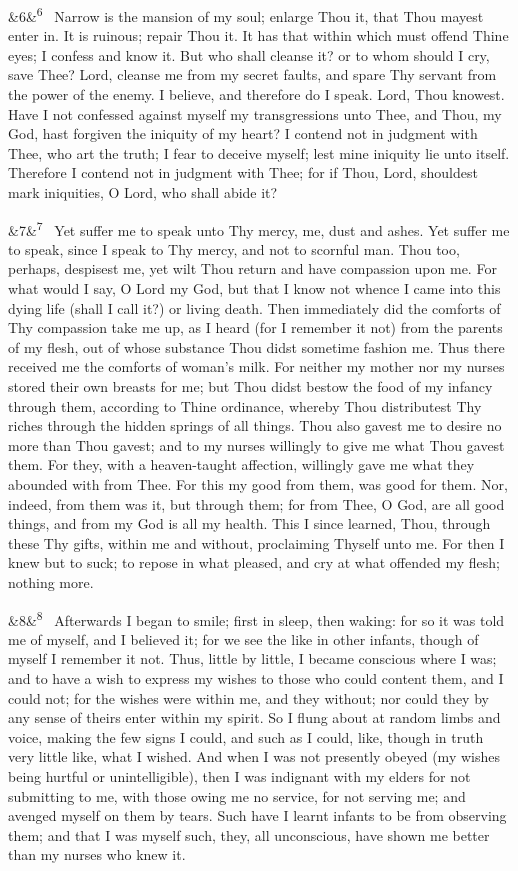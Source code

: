 \documentclass[12pt]{article}
\newcommand{\para}[1][]{\par\noindent\ifx&#1&\else\textsuperscript{\footnotesize #1}~\fi}
\begin{document}
\para[6] Narrow is the mansion of my soul; enlarge Thou it, that Thou mayest enter in. It is ruinous; repair Thou it. It has that within which must offend Thine eyes; I confess and know it. But who shall cleanse it? or to whom should I cry, save Thee? Lord, cleanse me from my secret faults, and spare Thy servant from the power of the enemy. I believe, and therefore do I speak. Lord, Thou knowest. Have I not confessed against myself my transgressions unto Thee, and Thou, my God, hast forgiven the iniquity of my heart? I contend not in judgment with Thee, who art the truth; I fear to deceive myself; lest mine iniquity lie unto itself. Therefore I contend not in judgment with Thee; for if Thou, Lord, shouldest mark iniquities, O Lord, who shall abide it?

\para[7] Yet suffer me to speak unto Thy mercy, me, dust and ashes. Yet suffer me to speak, since I speak to Thy mercy, and not to scornful man. Thou too, perhaps, despisest me, yet wilt Thou return and have compassion upon me. For what would I say, O Lord my God, but that I know not whence I came into this dying life (shall I call it?) or living death. Then immediately did the comforts of Thy compassion take me up, as I heard (for I remember it not) from the parents of my flesh, out of whose substance Thou didst sometime fashion me. Thus there received me the comforts of woman's milk. For neither my mother nor my nurses stored their own breasts for me; but Thou didst bestow the food of my infancy through them, according to Thine ordinance, whereby Thou distributest Thy riches through the hidden springs of all things. Thou also gavest me to desire no more than Thou gavest; and to my nurses willingly to give me what Thou gavest them. For they, with a heaven-taught affection, willingly gave me what they abounded with from Thee. For this my good from them, was good for them. Nor, indeed, from them was it, but through them; for from Thee, O God, are all good things, and from my God is all my health. This I since learned, Thou, through these Thy gifts, within me and without, proclaiming Thyself unto me. For then I knew but to suck; to repose in what pleased, and cry at what offended my flesh; nothing more.

\para[8] Afterwards I began to smile; first in sleep, then waking: for so it was told me of myself, and I believed it; for we see the like in other infants, though of myself I remember it not. Thus, little by little, I became conscious where I was; and to have a wish to express my wishes to those who could content them, and I could not; for the wishes were within me, and they without; nor could they by any sense of theirs enter within my spirit. So I flung about at random limbs and voice, making the few signs I could, and such as I could, like, though in truth very little like, what I wished. And when I was not presently obeyed (my wishes being hurtful or unintelligible), then I was indignant with my elders for not submitting to me, with those owing me no service, for not serving me; and avenged myself on them by tears. Such have I learnt infants to be from observing them; and that I was myself such, they, all unconscious, have shown me better than my nurses who knew it.
\end{document}
